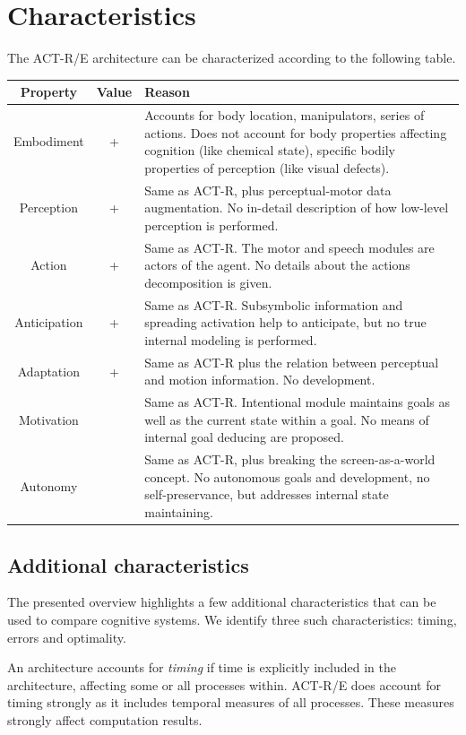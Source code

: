 \documentclass[10pt]{article}
\begin{document}
\section {Characteristics}

The ACT-R/E architecture can be characterized according to the following table.

\begin{tabular}{|c|c|p{300pt}|}
\hline
Property & Value & Reason \\
\hline
Embodiment & + & Accounts for body location, manipulators, series of actions. Does not account for body properties affecting cognition (like chemical state), specific bodily properties of perception (like visual defects).\\
\hline
Perception & + & Same as ACT-R, plus perceptual-motor data augmentation. No in-detail description of how low-level perception is performed.\\
\hline
Action & + & Same as ACT-R. The motor and speech modules are actors of the agent. No details about the actions decomposition is given.\\
\hline
Anticipation & + & Same as ACT-R. Subsymbolic information and spreading activation help to anticipate, but no true internal modeling is performed. \\
\hline
Adaptation & + & Same as ACT-R plus the relation between perceptual and motion information. No development.\\ 
\hline
Motivation & & Same as ACT-R. Intentional module maintains goals as well as the current state within a goal. No means of internal goal deducing are proposed.\\
\hline
Autonomy & & Same as ACT-R, plus breaking the screen-as-a-world concept. No autonomous goals and development, no self-preservance, but addresses internal state maintaining.\\
\hline

\end{tabular}

\subsection{Additional characteristics}

The presented overview highlights a few additional characteristics that can be used to compare cognitive systems. We identify three such characteristics: timing, errors and optimality.

An architecture accounts for \emph{timing} if time is explicitly included in the architecture, affecting some or all processes within. ACT-R/E does account for timing strongly as it includes temporal measures of all processes. These measures strongly affect computation results.
\end{document}

